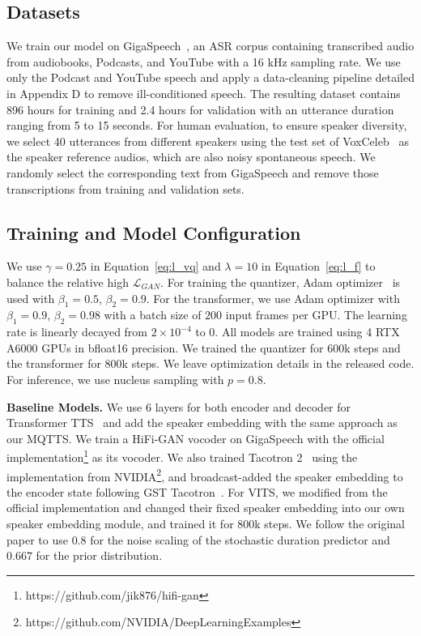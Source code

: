 \documentclass[letterpaper]{article}
\begin{document}
\subsection{Datasets}
\label{ssec:data}
We train our model on GigaSpeech~\cite{GigaSpeech2021}, an ASR corpus containing transcribed audio from audiobooks, Podcasts, and YouTube with a 16 kHz sampling rate.
We use only the Podcast and YouTube speech and apply a data-cleaning pipeline detailed in Appendix D to remove ill-conditioned speech.
The resulting dataset contains 896 hours for training and 2.4 hours for validation with an utterance duration ranging from 5 to 15 seconds.
For human evaluation, to ensure speaker diversity, we select 40 utterances from different speakers using the test set of VoxCeleb~\cite{Nagrani19} as the speaker reference audios, which are also noisy spontaneous speech.
We randomly select the corresponding text from GigaSpeech and remove those transcriptions from training and validation sets.

\subsection{Training and Model Configuration}
We use $\gamma = 0.25$ in Equation~\ref{eq:l_vq} and $\lambda = 10$ in Equation~\ref{eq:l_f} to balance the relative high $\mathcal{L}_{GAN}$.
For training the quantizer, Adam optimizer~\cite{kingma2014adam} is used with $\beta_1 = 0.5$, $\beta_2 = 0.9$.
For the transformer, we use Adam optimizer with $\beta_1 = 0.9$, $\beta_2 = 0.98$ with a batch size of $200$ input frames per GPU.
The learning rate is linearly decayed from $2\times 10^{-4}$ to $0$.
All models are trained using 4 RTX A6000 GPUs in bfloat16 precision.
We trained the quantizer for 600k steps and the transformer for 800k steps.
We leave optimization details in the released code.
For inference, we use nucleus sampling with $p=0.8$.

\textbf{Baseline Models.}
We use 6 layers for both encoder and decoder for Transformer TTS~\cite{Li_Liu_Liu_Zhao_Liu_2019} and add the speaker embedding with the same approach as our MQTTS.
We train a HiFi-GAN vocoder on GigaSpeech with the official implementation\footnote{https://github.com/jik876/hifi-gan} as its vocoder.
We also trained Tacotron 2~\cite{8461368} using the implementation from NVIDIA\footnote{https://github.com/NVIDIA/DeepLearningExamples}, and broadcast-added the speaker embedding to the encoder state following GST Tacotron~\cite{Wang2018StyleTU}.
For VITS, we modified from the official implementation and changed their fixed speaker embedding into our own speaker embedding module, and trained it for 800k steps.
We follow the original paper to use $0.8$ for the noise scaling of the stochastic duration predictor and $0.667$ for the prior distribution.
\end{document}
